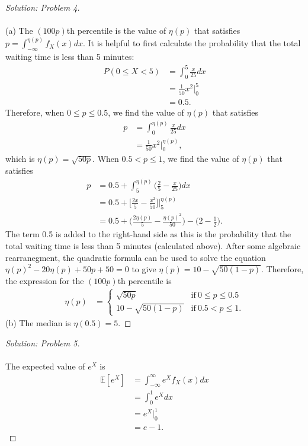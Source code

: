\documentclass[10pt]{article}
\begin{document}
\vspace{0.2cm}
\begin{proof}[Solution: Problem 4]
\text{}\\
\text{}\\
(a)
The $(100p)$th percentile is the value of $\eta(p)$ that satisfies $p = \int^{\eta(p)}_{-\infty} f_X(x)dx$. It is helpful to first calculate the probability that the total waiting time is less than 5 minutes:
\begin{align*}
P(0 \leq X < 5) &= \int^{5}_{0} \frac{x}{25}dx\\
&= \frac{1}{50}x^2\bigg|^5_0 \\
&= 0.5.
\end{align*}
Therefore, when $0 \leq p \leq 0.5$, we find the value of $\eta(p)$ that satisfies
\begin{align*}
p &= \int^{\eta(p)}_0 \frac{x}{25}dx\\
&= \frac{1}{50}x^2\bigg|^{\eta(p)}_0,
\end{align*}
which is $\eta(p) = \sqrt{50p}$. When $0.5 < p \leq 1$, we find the value of $\eta(p)$ that satisfies
\begin{align*}
p &= 0.5 + \int^{\eta(p)}_5 \bigg(\frac{2}{5} -\frac{x}{25}\bigg)dx\\
&=  0.5 + \bigg[\frac{2x}{5} -\frac{x^2}{50}\bigg]\bigg|^{\eta(p)}_5\\
&=  0.5 + \bigg(\frac{2\eta(p)}{5} -\frac{\eta(p)^2}{50}\bigg) - \bigg(2 -\frac{1}{2}\bigg).
\end{align*}
The term 0.5 is added to the right-hand side as this is the probability that the total waiting time is less than 5 minutes (calculated above). After some algebraic rearranegment, the quadratic formula can be used to solve the equation $\eta(p)^2 - 20\eta(p) + 50p + 50 = 0$ to give $\eta(p) = 10 - \sqrt{50(1-p)}$. Therefore, the expression for the $(100p)$th percentile is
\begin{align*}
    \eta(p) &= 
    \begin{cases}
      \sqrt{50p} & \text{if}\ 0 \leq p \leq 0.5 \\
      10 - \sqrt{50(1-p)} & \text{if}\ 0.5 < p \leq 1.
    \end{cases}
\end{align*}
(b) The median is $\eta(0.5) = 5$.
\end{proof}

\vspace{0.2cm}
\begin{proof}[Solution: Problem 5]
\text{}\\
\text{}\\
The expected value of $e^X$ is
\begin{align*}
\mathbb{E}[e^X] &= \int_{-\infty}^\infty e^X f_X(x) dx\\
&= \int_0^1 e^X dx\\
&= e^X\big|^1_0\\
&= e - 1.
\end{align*}
\end{proof}
\end{document}
